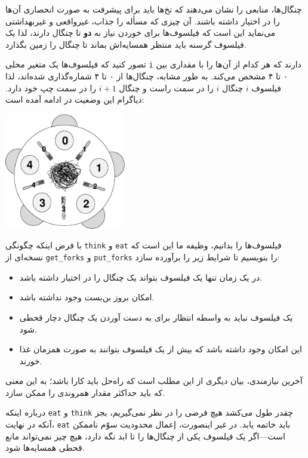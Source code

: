 \documentclass{book}
\begin{document}
    چنگال‌ها، منابعی را نشان می‌دهند که نخ‌ها باید برای پیشرفت به صورت انحصاری آن‌ها را در اختیار داشته باشند.
    آن چیزی که مسأله را جذاب، غیرواقعی و غیربهداشتی می‌نماید این است که فیلسوف‌ها برای  خوردن نیاز به \textbf{دو} تا چنگال دارند، لذا 
    یک فیلسوف گرسنه باید منتظر همسایه‌اش بماند تا چنگال را زمین بگذارد. 

    تصور کنید که فیلسوف‌ها یک متغیر محلی {\tt i} دارند که هر کدام  از آن‌ها را با مقداری بین ۰ تا ۴ مشخص می‌کند. 
    به طور مشابه، چنگال‌ها از ۰ تا ۴ شماره‌گذاری شده‌اند، 
    لذا فیلسوف $i$ چنگال $i$ را در سمت راست و چنگال  $i+1$  را در سمت چپ خود دارد.
    دیاگرام این وضعیت در ادامه آمده است: 

\centerline{\includegraphics[height=2in]{table.eps}}

    با فرض اینکه چگونگی {\tt think} و {\tt eat} فیلسوف‌ها را بدانیم، وظیفه ما این است که 
    نسخه‌ای از {\tt get\_forks} و {\tt put\_forks}   را بنویسیم تا شرایط زیر را برآورده سازد:

\begin{itemize}

\item 
    در یک زمان تنها یک فیلسوف بتواند یک چنگال را در اختیار داشته باشد. 

\item 
    امکان بروز بن‌بست وجود نداشته باشد. 

\item 
    یک فیلسوف نباید به واسطه انتظار برای به دست آوردن یک چنگال دچار قحطی شود. 

\item 
    این امکان وجود داشته باشد که بیش از یک فیلسوف بتوانند به صورت همزمان غذا خورند. 

\end{itemize}

    آخرین نیازمندی، بیان دیگری از این مطلب است که راه‌حل باید کارا باشد؛ به این معنی که باید حداکثر مقدار همروندی را ممکن سازد. 

    درباره اینکه {\tt eat} و {\tt think} چقدر طول می‌کشد هیچ فرضی  را در نظر نمی‌گیریم، بجز آنکه در نهایت، {\tt eat}  باید خاتمه یابد. 
    در غیر اینصورت، إعمال محدودیت سوّم ناممکن است---اگر یک فیلسوف یکی از چنگال‌ها را تا ابد نگه دارد، 
    هیچ چیز نمی‌تواند مانع قحطی همسایه‌ها شود. 
    
\end{document}
